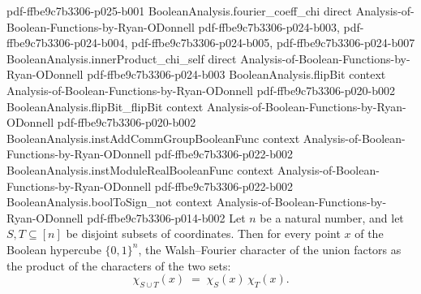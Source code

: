 \begin{lemma}
{    pdf-ffbe9c7b3306-p025-b001}
\proofstep
  {BooleanAnalysis.fourier_coeff_chi}
  {direct}
  {Analysis-of-Boolean-Functions-by-Ryan-ODonnell}
  {pdf-ffbe9c7b3306-p024-b003,
    pdf-ffbe9c7b3306-p024-b004,
    pdf-ffbe9c7b3306-p024-b005,
    pdf-ffbe9c7b3306-p024-b007}
\proofstep
  {BooleanAnalysis.innerProduct_chi_self}
  {direct}
  {Analysis-of-Boolean-Functions-by-Ryan-ODonnell}
  {pdf-ffbe9c7b3306-p024-b003}
\proofstep
  {BooleanAnalysis.flipBit}
  {context}
  {Analysis-of-Boolean-Functions-by-Ryan-ODonnell}
  {pdf-ffbe9c7b3306-p020-b002}
\proofstep
  {BooleanAnalysis.flipBit_flipBit}
  {context}
  {Analysis-of-Boolean-Functions-by-Ryan-ODonnell}
  {pdf-ffbe9c7b3306-p020-b002}
\proofstep
  {BooleanAnalysis.instAddCommGroupBooleanFunc}
  {context}
  {Analysis-of-Boolean-Functions-by-Ryan-ODonnell}
  {pdf-ffbe9c7b3306-p022-b002}
\proofstep
  {BooleanAnalysis.instModuleRealBooleanFunc}
  {context}
  {Analysis-of-Boolean-Functions-by-Ryan-ODonnell}
  {pdf-ffbe9c7b3306-p022-b002}
\proofstep
  {BooleanAnalysis.boolToSign_not}
  {context}
  {Analysis-of-Boolean-Functions-by-Ryan-ODonnell}
  {pdf-ffbe9c7b3306-p014-b002}
Let $n$ be a natural number, and let $S, T \subseteq [n]$ be disjoint subsets of
coordinates. Then for every point $x$ of the Boolean hypercube $\{0,1\}^n$, the
Walsh--Fourier character of the union factors as the product of the characters of the
two sets:
\[
  \chi_{S \cup T}(x) \;=\; \chi_S(x)\,\chi_T(x).
\]
\end{lemma}

